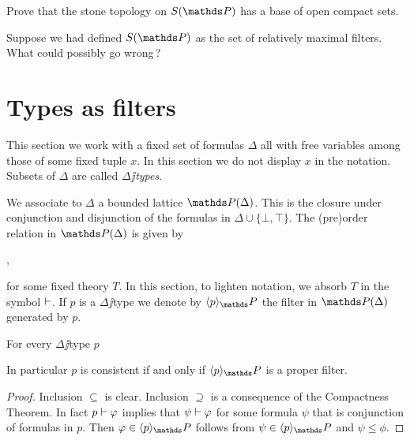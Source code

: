 \documentclass[creche.tex]{subfiles}
\begin{document}
\begin{exercise}
Prove that the stone topology on $S(\PP)$ has a base of open compact sets.\QED
\end{exercise}

\begin{exercise}
Suppose we had defined $S(\PP)$ as the set of relatively maximal filters.
What could possibly go wrong\,?\QED
\end{exercise}
\section{Types as filters}\label{frammenti}

This section we work with a fixed set of formulas \emph{$\Delta$\/} all with free variables among those of some fixed tuple \emph{$x$}.
In this section we do not display $x$ in the notation.
Subsets of $\Delta$ are called \emph{$\Delta\jj$types}.

We associate to $\Delta$ a bounded lattice \emph{$\PP(\Delta)$}.
This is the closure under conjunction and disjunction of the formulas in $\Delta\cup\{\bot,\top\}$.
The (pre)order relation in $\PP(\Delta)$ is given by

,

for some fixed theory $T$.
In this section, to lighten notation, we absorb $T$ in the symbol $\vdash$.
If $p$ is a $\Delta\jj$type we denote by $\<p\>_\PP$ the filter in $\PP(\Delta)$ generated by $p$.




\begin{lemma}\label{lem_poiuyhdsdfd}
For every $\Delta\jj$type $p$


In particular $p$ is consistent if and only if $\<p\>_\PP$ is a proper filter.
\end{lemma}



\begin{proof}
Inclusion $\subseteq$ is clear.
Inclusion $\supseteq$ is a consequence of the Compactness Theorem.
In fact $p\vdash\varphi$ implies that $\psi\vdash\varphi$ for some formula $\psi$ that is conjunction of formulas in $p$.
Then $\phi\in\<p\>_\PP$ follows from $\psi\in\<p\>_\PP$ and $\psi\le\phi$.
\end{proof}
\end{document}
